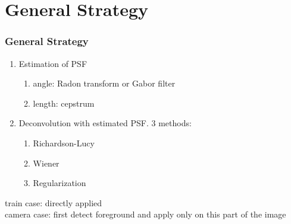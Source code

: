 \section[G. Strategy]{General Strategy}

\begin{frame}
	\frametitle{General Strategy}
	\begin{enumerate}
	\item Estimation of PSF
		\begin{enumerate}
		\item angle: Radon transform or Gabor filter
		\item length: cepstrum
		\end{enumerate}
	\item Deconvolution with estimated PSF. 3 methods:
		\begin{enumerate}
		\item Richardson-Lucy
		\item Wiener
		\item Regularization
		\end{enumerate}
	\end{enumerate}
	train case: directly applied\\
	camera case: first detect foreground and apply only on this part of the image
\end{frame}